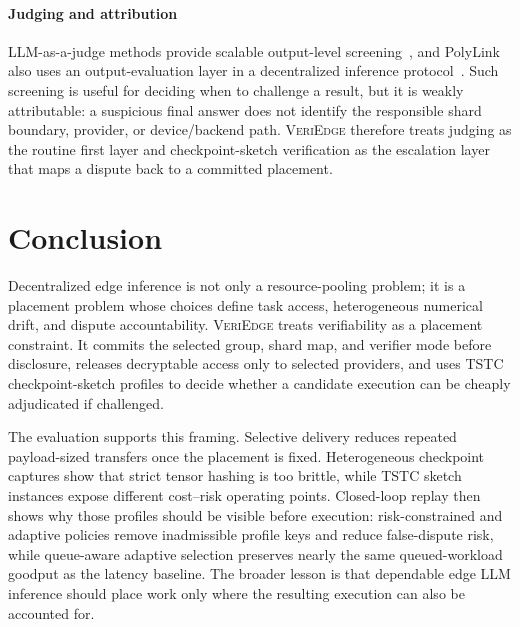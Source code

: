 \documentclass[sigplan,screen,review,anonymous]{acmart}
\newcommand{\system}{\textsc{VeriEdge}\xspace}
\begin{document}
\paragraph{Judging and attribution}
LLM-as-a-judge methods provide scalable output-level screening~\cite{
	zheng2023judging}, and PolyLink also uses an output-evaluation layer in a
decentralized inference protocol~\cite{liu2025polylink}. Such screening is
useful for deciding when to challenge a result, but it is weakly
attributable: a suspicious final answer does not identify the responsible
shard boundary, provider, or device/backend path. \system therefore treats
judging as the routine first layer and checkpoint-sketch verification as the
escalation layer that maps a dispute back to a committed placement.

\section{Conclusion}
\label{sec:conclusion}
Decentralized edge inference is not only a resource-pooling problem; it is a
placement problem whose choices define task access, heterogeneous numerical
drift, and dispute accountability. \system treats verifiability as a
placement constraint. It commits the selected group, shard map, and verifier
mode before disclosure, releases decryptable access only to selected
providers, and uses TSTC checkpoint-sketch profiles to decide whether a
candidate execution can be cheaply adjudicated if challenged.

The evaluation supports this framing. Selective delivery reduces repeated
payload-sized transfers once the placement is fixed. Heterogeneous checkpoint
captures show that strict tensor hashing is too brittle, while TSTC sketch
instances expose different cost--risk operating points. Closed-loop replay
then shows why those profiles should be visible before execution:
risk-constrained and adaptive policies remove inadmissible profile keys and
reduce false-dispute risk, while queue-aware adaptive selection preserves
nearly the same queued-workload goodput as the latency baseline. The broader
lesson is that dependable edge LLM inference should place work only where the
resulting execution can also be accounted for.



\end{document}
